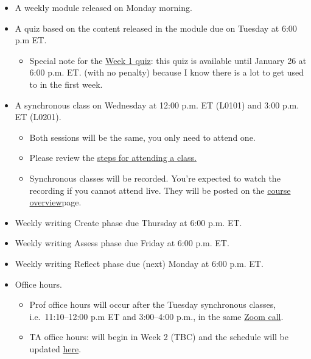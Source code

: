 \documentclass[
]{book}
\providecommand{\tightlist}{%
  \setlength{\itemsep}{0pt}\setlength{\parskip}{0pt}}
\begin{document}
\begin{itemize}
\item
  A weekly module released on Monday morning.
\item
  A quiz based on the content released in the module due on Tuesday at 6:00 p.m ET.~

  \begin{itemize}
  \tightlist
  \item
    Special note for the \href{https://q.utoronto.ca/courses/204826/quizzes/138607}{Week 1 quiz}: this quiz is available until January 26 at 6:00 p.m. ET. (with no penalty) because I know there is a lot to get used to in the first week.
  \end{itemize}
\item
  A synchronous class on Wednesday at 12:00 p.m. ET (L0101) and 3:00 p.m. ET (L0201).

  \begin{itemize}
  \item
    Both sessions will be the same, you only need to attend one.
  \item
    Please review the \href{https://q.utoronto.ca/courses/204826/pages/join-synchronous-class}{steps for attending a class.}
  \item
    Synchronous classes will be recorded. You're expected to watch the recording if you cannot attend live. They will be posted on the \href{https://q.utoronto.ca/courses/204826/pages/course-overview}{course overview}page.
  \end{itemize}
\item
  Weekly writing Create phase due Thursday at 6:00 p.m. ET.
\item
  Weekly writing Assess phase due Friday at 6:00 p.m. ET.
\item
  Weekly writing Reflect phase due (next) Monday at 6:00 p.m. ET.
\item
  Office hours.

  \begin{itemize}
  \item
    Prof office hours will occur after the Tuesday synchronous classes, i.e.~11:10--12:00 p.m ET and 3:00--4:00 p.m., in the same \href{https://q.utoronto.ca/courses/204826/pages/join-synchronous-class}{Zoom call}.
  \item
    TA office hours: will begin in Week 2 (TBC) and the schedule will be updated \href{https://q.utoronto.ca/courses/204826/pages/office-hours}{here}.
  \end{itemize}
\end{itemize}
\end{document}
